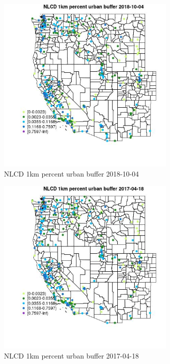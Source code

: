\begin{figure} 
\centering  
\includegraphics[width=0.77\textwidth]{Code_Outputs/Report_ML_input_PM25_Step4_part_f_de_duplicated_aves_prioritize_24hr_obswNAs_MapObsNLCD_1km_percent_urban_buffer2018-10-04.jpg} 
\caption{\label{fig:Report_ML_input_PM25_Step4_part_f_de_duplicated_aves_prioritize_24hr_obswNAsMapObsNLCD_1km_percent_urban_buffer2018-10-04}NLCD 1km percent urban buffer 2018-10-04} 
\end{figure} 
 

\begin{figure} 
\centering  
\includegraphics[width=0.77\textwidth]{Code_Outputs/Report_ML_input_PM25_Step4_part_f_de_duplicated_aves_prioritize_24hr_obswNAs_MapObsNLCD_1km_percent_urban_buffer2017-04-18.jpg} 
\caption{\label{fig:Report_ML_input_PM25_Step4_part_f_de_duplicated_aves_prioritize_24hr_obswNAsMapObsNLCD_1km_percent_urban_buffer2017-04-18}NLCD 1km percent urban buffer 2017-04-18} 
\end{figure} 
 

